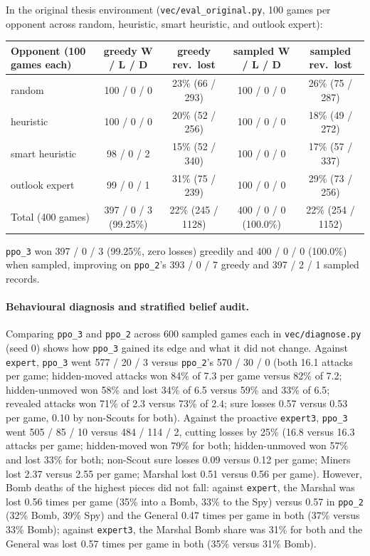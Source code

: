 In the original thesis environment (\texttt{vec/eval\_original.py}, 100 games per opponent across
random, heuristic, smart heuristic, and outlook expert):
\begin{center}
\small
\begin{tabular}{lcccc}
\toprule
Opponent (100 games each) & greedy W / L / D & greedy rev.\ lost & sampled W / L / D & sampled rev.\ lost \\
\midrule
random          & 100 / 0 / 0 & 23\% (66 / 293) & 100 / 0 / 0 & 26\% (75 / 287) \\
heuristic       & 100 / 0 / 0 & 20\% (52 / 256) & 100 / 0 / 0 & 18\% (49 / 272) \\
smart heuristic & 98 / 0 / 2  & 15\% (52 / 340) & 100 / 0 / 0 & 17\% (57 / 337) \\
outlook expert  & 99 / 0 / 1  & 31\% (75 / 239) & 100 / 0 / 0 & 29\% (73 / 256) \\
\midrule
Total (400 games) & 397 / 0 / 3 (99.25\%) & 22\% (245 / 1128) & 400 / 0 / 0 (100.0\%) & 22\% (254 / 1152) \\
\bottomrule
\end{tabular}
\end{center}
\texttt{ppo\_3} won 397 / 0 / 3 (99.25\%, zero losses) greedily and 400 / 0 / 0 (100.0\%) when
sampled, improving on \texttt{ppo\_2}'s 393 / 0 / 7 greedy and 397 / 2 / 1 sampled records.

\paragraph{Behavioural diagnosis and stratified belief audit.} Comparing \texttt{ppo\_3} and
\texttt{ppo\_2} across 600 sampled games each in \texttt{vec/diagnose.py} (seed 0) shows how
\texttt{ppo\_3} gained its edge and what it did not change. Against \texttt{expert}, \texttt{ppo\_3}
went 577 / 20 / 3 versus \texttt{ppo\_2}'s 570 / 30 / 0 (both 16.1 attacks per game; hidden-moved
attacks won 84\% of 7.3 per game versus 82\% of 7.2; hidden-unmoved won 58\% and lost 34\% of 6.5
versus 59\% and 33\% of 6.5; revealed attacks won 71\% of 2.3 versus 73\% of 2.4; sure losses
0.57 versus 0.53 per game, 0.10 by non-Scouts for both). Against the proactive \texttt{expert3},
\texttt{ppo\_3} went 505 / 85 / 10 versus 484 / 114 / 2, cutting losses by 25\% (16.8 versus 16.3
attacks per game; hidden-moved won 79\% for both; hidden-unmoved won 57\% and lost 33\% for both;
non-Scout sure losses 0.09 versus 0.12 per game; Miners lost 2.37 versus 2.55 per game; Marshal
lost 0.51 versus 0.56 per game). However, Bomb deaths of the highest pieces did not fall: against
\texttt{expert}, the Marshal was lost 0.56 times per game (35\% into a Bomb, 33\% to the Spy)
versus 0.57 in \texttt{ppo\_2} (32\% Bomb, 39\% Spy) and the General 0.47 times per game in both
(37\% versus 33\% Bomb); against \texttt{expert3}, the Marshal Bomb share was 31\% for both and
the General was lost 0.57 times per game in both (35\% versus 31\% Bomb).


